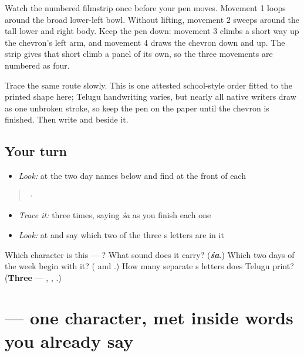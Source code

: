 Watch the numbered filmstrip once before your pen moves. Movement 1 loops around the broad lower-left bowl. Without lifting, movement 2 sweeps around the tall lower and right body. Keep the pen down: movement 3 climbs a short way up the chevron's left arm, and movement 4 draws the chevron down and up. The strip gives that short climb a panel of its own, so the three movements are numbered as four.

Trace the same route slowly. This is one attested school-style order fitted to the printed shape here; Telugu handwriting varies, but nearly all native writers draw  as one unbroken stroke, so keep the pen on the paper until the chevron is finished. Then write  and  beside it.

\subsection*{Your turn}
\begin{itemize}
\raggedright
  \item \emph{Look:} at the two day names below and find  at the front of each
\end{itemize}

\begin{quote}
  ·  
\end{quote}

\begin{itemize}
\raggedright
  \item \emph{Trace it:}  three times, saying \emph{śa} as you finish each one
  \item \emph{Look:} at  and say which two of the three s letters are in it
\end{itemize}

\begin{tcolorbox}[breakable,colback=teal!4,colframe=teal!35!black,title={Before you move on}]
Which character is this — ? What sound does it carry? (\emph{\textbf{śa}}.) Which two days of the week begin with it? (\textbf{} and \textbf{}.) How many separate s letters does Telugu print? (\textbf{Three} — , , .)
\end{tcolorbox}
\section[\texorpdfstring{\te{ల} (la)}{ల (la)}]{ — one character, met inside words you already say}

